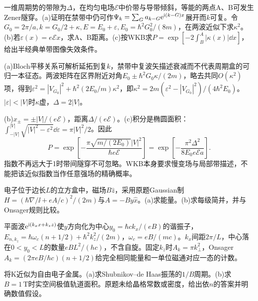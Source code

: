 \begin{exercise}[原题1(a)--(c)]
一维周期势的带隙为$\Delta$，在均匀电场$\mathcal E$中价带与导带倾斜，等能的两点A、B可发生Zener隧穿。(a)证明在禁带中仍可作$\Psi_k=\sum_Ga_{k-G}\mathrm e^{\mathrm i(k-G)x}$展开而$k$可复。令$G_0=2\pi/a,k=G_0/2+\kappa,E=E_0+\varepsilon,E_0=\hbar^2G_0^2/(8m)$，在两波近似下求$\kappa^2$。(b)若$\varepsilon(x)=e\mathcal E x$，求A、B距离。(c)按WKB求$P=\exp[-2\int_B^A|\kappa(x)|\dd x]$，给出半经典单带图像失效条件。
\end{exercise}
\begin{solution}
(a)Bloch平移关系可解析延拓到复$k$，禁带中复波矢描述衰减而不代表周期盒的可归一本征态。两波矩阵在区界附近对角$E_0\pm\hbar^2G_0\kappa/(2m)$，略去共同$O(\kappa^2)$项，得到$\varepsilon^2=|V_{G_0}|^2+\hbar^2(2E_0/m)\kappa^2$，即$\kappa^2=2m(\varepsilon^2-|V_{G_0}|^2)/(4\hbar^2E_0)$。$|\varepsilon|<|V|$时$\kappa$虚，$\Delta=2|V|$。

(b)$x_\pm=\pm|V|/(e\mathcal E)$，距离$\Delta/(e\mathcal E)$。(c)积分是椭圆面积：$\int_{-|V|}^{|V|}\sqrt{|V|^2-\varepsilon^2}\dd\varepsilon=\pi|V|^2/2$。因此
\begin{equation}
P=\exp\left[-\frac{\pi\sqrt{m/(2E_0)}|V|^2}{\hbar e\mathcal E}\right]=\exp\left[-\frac{\pi^2\Delta^2}{8E_0e\mathcal E a}\right].
\end{equation}
指数不再远大于1时带间隧穿不可忽略。WKB本身要求慢变场与局部带描述，不能把该近似指数当作任意强场的精确概率。
\end{solution}
\begin{exercise}[原题2(a)--(b)]
电子位于边长$L$的立方盒中，磁场$B\hat z$，采用原题Gaussian制$H=(\hbar\nabla/\ii+eA/c)^2/(2m)$与$A=-By\hat x$。(a)求能量。(b)求每级简并，并与Onsager规则比较。
\end{exercise}
\begin{solution}
平面波$\mathrm e^{\mathrm i(k_xx+k_zz)}$使$y$方向化为中心$y_0=\hbar ck_x/(eB)$的谐振子，$E_{n,k_z}=\hbar\omega_c(n+1/2)+\hbar^2k_z^2/(2m)$，$\omega_c=eB/(mc)$。$k_x$间距$2\pi/L$，中心落在$0<y_0<L$的数量$eBL^2/(hc)$，不含自旋。固定$k_z$时$A_k=\pi k_\perp^2$，Onsager$A_k=(2\pi eB/\hbar c)(n+1/2)$给完全相同能量和一单位磁通对应一态的计数。
\end{solution}
\begin{exercise}[原题1(a)--(b)]
将K近似为自由电子金属。(a)求Shubnikov--de Haas振荡的$1/B$周期。(b)求$B=1\,\mathrm T$时实空间极值轨道面积。原题未给晶格常数或密度，给出依$n$的答案并明确数值假设。
\end{exercise}
